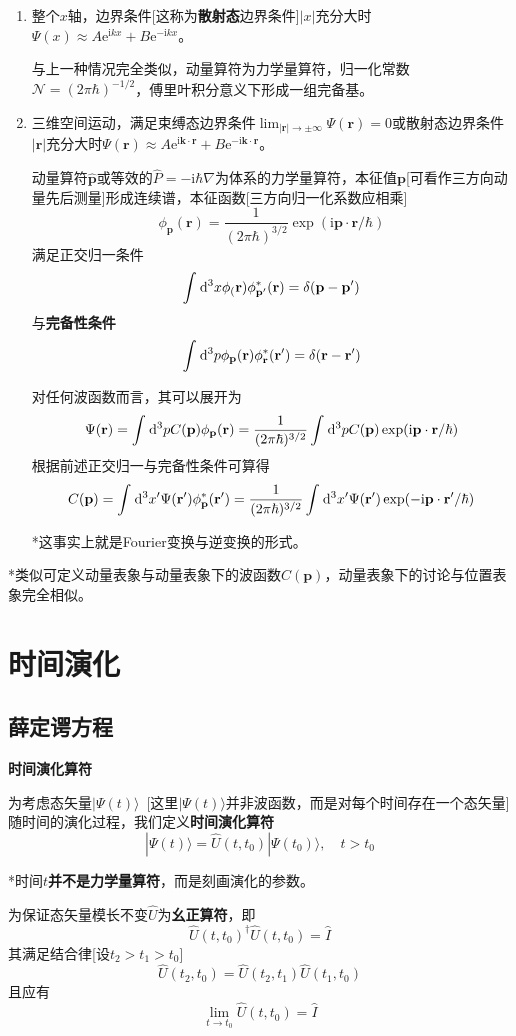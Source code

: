 \documentclass[a4paper,UTF8,fontset=windows]{ctexart}
\newcommand*{\dr}{\hspace{0.07em}\mathrm{d}}
\newcommand*{\ir}{\mathrm{i}}
\newcommand*{\er}{\mathrm{e}}
\newcommand*{\ket}[1]{|#1\rangle}
\newcommand*{\br}{\mathbf{r}}
\newcommand*{\bp}{\mathbf{p}}
\begin{document}
\begin{enumerate}
    \item 整个$x$轴，边界条件[这称为\textbf{散射态}边界条件]$|x|$充分大时$\Psi(x)\approx A\er^{\ir kx}+B\er^{-\ir kx}$。
    
    与上一种情况完全类似，动量算符为力学量算符，归一化常数$\mathcal{N}=(2\pi\hbar)^{-1/2}$，傅里叶积分意义下形成一组完备基。

    \item 三维空间运动，满足束缚态边界条件$\lim_{|\br|\to\pm\infty}\Psi(\br)=0$或散射态边界条件$|\br|$充分大时$\Psi(\br)\approx A\er^{\ir\mathbf{k}\cdot\br}+B\er^{-\ir\mathbf{k}\cdot\br}$。
    
    动量算符$\hat{\bp}$或等效的$\hat{P}=-\ir\hbar\nabla$为体系的力学量算符，本征值$\bp$[可看作三方向动量先后测量]形成连续谱，本征函数[三方向归一化系数应相乘]
    $$\phi_\bp(\br)=\frac{1}{(2\pi\hbar)^{3/2}}\exp(\ir\bp\cdot\br/\hbar)$$
    满足正交归一条件
    $$\int\dr^3x\phi_(\br)\phi_{\bp'}^*(\br)=\delta(\bp-\bp')$$
    与\textbf{完备性条件}
    $$\int\dr^3p\phi_\bp(\br)\phi_\br^*(\br')=\delta(\br-\br')$$

    对任何波函数而言，其可以展开为
    $$\Psi(\br)=\int\dr^3pC(\bp)\phi_\bp(\br)=\frac{1}{(2\pi\hbar)^{3/2}}\int\dr^3pC(\bp)\exp(\ir\bp\cdot\br/\hbar)$$
    根据前述正交归一与完备性条件可算得
    $$C(\bp)=\int\dr^3x'\Psi(\br')\phi_\bp^*(\br')=\frac{1}{(2\pi\hbar)^{3/2}}\int\dr^3x'\Psi(\br')\exp(-\ir\bp\cdot\br'/\hbar)$$

    *这事实上就是Fourier变换与逆变换的形式。
\end{enumerate}

*类似可定义动量表象与动量表象下的波函数$C(\bp)$，动量表象下的讨论与位置表象完全相似。

\section{时间演化}
\subsection{薛定谔方程}
\textbf{时间演化算符}

为考虑态矢量$\ket{\Psi(t)}$\ [这里$\ket{\Psi(t)}$并非波函数，而是对每个时间存在一个态矢量]随时间的演化过程，我们定义\textbf{时间演化算符}
$$\ket{\Psi(t)}=\hat{U}(t,t_0)\ket{\Psi(t_0)},\quad t>t_0$$

*时间$t$\textbf{并不是力学量算符}，而是刻画演化的参数。

为保证态矢量模长不变$\hat{U}$为\textbf{幺正算符}，即
$$\hat{U}(t,t_0)^\dagger\hat{U}(t,t_0)=\hat{I}$$
其满足结合律[设$t_2>t_1>t_0$]
$$\hat{U}(t_2,t_0)=\hat{U}(t_2,t_1)\hat{U}(t_1,t_0)$$
且应有
$$\lim_{t\to t_0}\hat{U}(t,t_0)=\hat{I}$$
\end{document}
